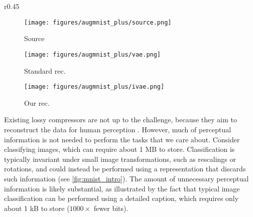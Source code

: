 \documentclass[final]{article}
\begin{document}
\begin{wrapfigure}{r}{0.45\textwidth}
\vspace{-\baselineskip}
\centering
\captionsetup[subfigure]{labelformat=empty}

\begin{minipage}{0.45\textwidth}
\centering
\begin{subfigure}[h]{0.32\columnwidth}
 \centering
 \texttt{[image: figures/augmnist\_plus/source.png]}
\caption{Source}
\end{subfigure}
\begin{subfigure}[h]{0.32\columnwidth}
 \centering
 \texttt{[image: figures/augmnist\_plus/vae.png]}
\caption{Standard rec.}
\end{subfigure}
\begin{subfigure}[h]{0.32\columnwidth}
 \centering
 \texttt{[image: figures/augmnist\_plus/ivae.png]}
\caption{Our rec.}
\end{subfigure}
 \vspace*{-0.5em}
\addtocounter{figure}{-1} 
\end{minipage}\vspace{-2\baselineskip}

\end{wrapfigure}
 
Existing lossy compressors are not up to the challenge, because they aim to reconstruct the data for human perception \cite{johnston_transform_1988,heeger_model_1995,lee_perceptual_2012,blau_rethinking_2019,pan_digital_1993,mentzer_high-fidelity_2020}. 
However, much of perceptual information is not needed to perform the tasks that we care about.
Consider classifying images, which can require about 1 MB to store. 
Classification is typically invariant under small image transformations, such as rescalings or rotations, and could instead be performed using a representation that discards such information (see \cref{fig:mnist_intro}). 
The amount of unnecessary perceptual information is likely substantial, as illustrated by the fact that typical image classification can be performed using a detailed caption, which requires only about 1 kB to store ($1000\times$ fewer bits).
\end{document}
